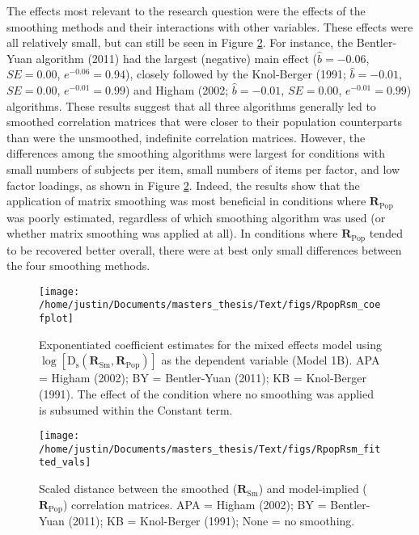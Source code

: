 \documentclass[
  english,
  man]{apa6}
\begin{document}
The effects most relevant to the research question were the effects of the smoothing methods and their interactions with other variables. These effects were all relatively small, but can still be seen in Figure \ref{fig:RpopRsm-fitted-vals}. For instance, the Bentler-Yuan algorithm (2011) had the largest (negative) main effect (\(\hat{b} = -0.06\), \(SE = 0.00\), \(e^{-0.06} = 0.94\)), closely followed by the Knol-Berger (1991; \(\hat{b} = -0.01\), \(SE = 0.00\), \(e^{-0.01} = 0.99\)) and Higham (2002; \(\hat{b} = -0.01\), \(SE = 0.00\), \(e^{-0.01} = 0.99\)) algorithms. These results suggest that all three algorithms generally led to smoothed correlation matrices that were closer to their population counterparts than were the unsmoothed, indefinite correlation matrices. However, the differences among the smoothing algorithms were largest for conditions with small numbers of subjects per item, small numbers of items per factor, and low factor loadings, as shown in Figure \ref{fig:RpopRsm-fitted-vals}. Indeed, the results show that the application of matrix smoothing was most beneficial in conditions where \(\mathbf{R}_{\textrm{Pop}}\) was poorly estimated, regardless of which smoothing algorithm was used (or whether matrix smoothing was applied at all). In conditions where \(\mathbf{R}_{\textrm{Pop}}\) tended to be recovered better overall, there were at best only small differences between the four smoothing methods.

\begin{figure}

{\centering \texttt{[image: /home/justin/Documents/masters\_thesis/Text/figs/RpopRsm\_coefplot]} 

}

\caption{Exponentiated coefficient estimates for the mixed effects model using $\log[\mathrm{D}_{\mathrm{s}}(\mathbf{R}_{\textrm{Sm}}, \mathbf{R}_{\textrm{Pop}})]$ as the dependent variable (Model 1B). APA = Higham (2002); BY = Bentler-Yuan (2011); KB = Knol-Berger (1991). The effect of the condition where no smoothing was applied is subsumed within the Constant term.}\label{fig:coefplot-RpopRsm}
\end{figure}

\begin{figure}

{\centering \texttt{[image: /home/justin/Documents/masters\_thesis/Text/figs/RpopRsm\_fitted\_vals]} 

}

\caption{Scaled distance between the smoothed ($\mathbf{R}_{\textrm{Sm}}$) and model-implied ($\mathbf{R}_{\textrm{Pop}}$) correlation matrices. APA = Higham (2002); BY = Bentler-Yuan (2011); KB = Knol-Berger (1991); None = no smoothing.}\label{fig:RpopRsm-fitted-vals}
\end{figure}
\end{document}
